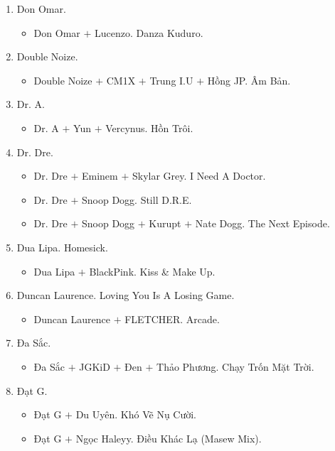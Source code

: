 \documentclass{article}
\begin{document}
\begin{enumerate}
\begin{itemize}
	\end{itemize}
	\item {\sc Don Omar.}
	\begin{itemize}
		\item {\sc Don Omar $+$ Lucenzo.} Danza Kuduro.
	\end{itemize}
	\item {\sc Double Noize.}
	\begin{itemize}
		\item {\sc Double Noize $+$ CM1X $+$ Trung I.U $+$ Hồng JP.} Âm Bản.
	\end{itemize}
	\item {\sc Dr. A.}
	\begin{itemize}
		\item {\sc Dr. A $+$ Yun $+$ Vercynus.} Hồn Trôi.
	\end{itemize}
	\item {\sc Dr. Dre.}
	\begin{itemize}
		\item {\sc Dr. Dre $+$ Eminem $+$ Skylar Grey.} I Need A Doctor.
		\item {\sc Dr. Dre $+$ Snoop Dogg.} Still D.R.E.
		\item {\sc Dr. Dre $+$ Snoop Dogg $+$ Kurupt $+$ Nate Dogg.} The Next Episode.
	\end{itemize}
	\item {\sc Dua Lipa.} Homesick.
	\begin{itemize}
		\item {\sc Dua Lipa $+$ BlackPink.} Kiss \& Make Up.
	\end{itemize}
	\item {\sc Duncan Laurence.} Loving You Is A Losing Game.
	\begin{itemize}
		\item {\sc Duncan Laurence $+$ FLETCHER.} Arcade.
	\end{itemize}
	\item {\sc Đa Sắc.}
	\begin{itemize}
		\item {\sc Đa Sắc $+$ JGKiD $+$ Đen $+$ Thảo Phương.} Chạy Trốn Mặt Trời.
	\end{itemize}
	\item {\sc Đạt G.}
	\begin{itemize}
		\item {\sc Đạt G $+$ Du Uyên.} Khó Vẽ Nụ Cười.
		\item {\sc Đạt G $+$ Ngọc Haleyy.} Điều Khác Lạ (Masew Mix).
	\end{itemize}

\end{enumerate}
\end{document}
